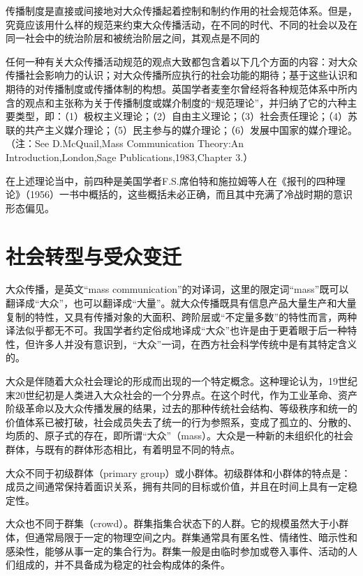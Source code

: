 \documentclass[UTF8,12pt]{ctexart}
\numberwithin{equation}{section} %
\numberwithin{figure}{section}
\numberwithin{table}{section}
\begin{document}
	
	传播制度是直接或间接地对大众传播起着控制和制约作用的社会规范体系。但是，究竟应该用什么样的规范来约束大众传播活动，在不同的时代、不同的社会以及在同一社会中的统治阶层和被统治阶层之间，其观点是不同的
	
	任何一种有关大众传播活动规范的观点大致都包含着以下几个方面的内容：对大众传播社会影响力的认识；对大众传播所应执行的社会功能的期待；基于这些认识和期待的对传播制度或传播体制的构想。英国学者麦奎尔曾经将各种规范体系中所内含的观点和主张称为关于传播制度或媒介制度的“规范理论”，并归纳了它的六种主要类型，即：（1）极权主义理论；（2）自由主义理论；（3）社会责任理论；（4）苏联的共产主义媒介理论；（5）民主参与的媒介理论；（6）发展中国家的媒介理论。（注：See D.McQuail,Mass Communication Theory:An Introduction,London,Sage Publications,1983,Chapter 3.）
	
	在上述理论当中，前四种是美国学者F.S.席伯特和施拉姆等人在《报刊的四种理论》（1956）一书中概括的，这些概括未必正确，而且其中充满了冷战时期的意识形态偏见。
	
	\section{社会转型与受众变迁}
	
	大众传播，是英文“mass communication”的对译词，这里的限定词“mass”既可以翻译成“大众”，也可以翻译成“大量”。就大众传播既具有信息产品大量生产和大量复制的特性，又具有传播对象的大面积、跨阶层或“不定量多数”的特性而言，两种译法似乎都无不可。我国学者约定俗成地译成“大众”也许是由于更着眼于后一种特性，但许多人并没有意识到，“大众”一词，在西方社会科学传统中是有其特定含义的。
	
	大众是伴随着大众社会理论的形成而出现的一个特定概念。这种理论认为，19世纪末20世纪初是人类进入大众社会的一个分界点。在这个时代，作为工业革命、资产阶级革命以及大众传播发展的结果，过去的那种传统社会结构、等级秩序和统一的价值体系已被打破，社会成员失去了统一的行为参照系，变成了孤立的、分散的、均质的、原子式的存在，即所谓“大众”（mass）。大众是一种新的未组织化的社会群体，与既有的群体形态相比，有着明显不同的特点。
	
	大众不同于初级群体（primary group）或小群体。初级群体和小群体的特点是：成员之间通常保持着面识关系，拥有共同的目标或价值，并且在时间上具有一定稳定性。
	
	大众也不同于群集（crowd）。群集指集合状态下的人群。它的规模虽然大于小群体，但通常局限于一定的物理空间之内。群集通常具有匿名性、情绪性、暗示性和感染性，能够从事一定的集合行为。群集一般是由临时参加或卷入事件、活动的人们组成的，并不具备成为稳定的社会构成体的条件。
	
\end{document}
